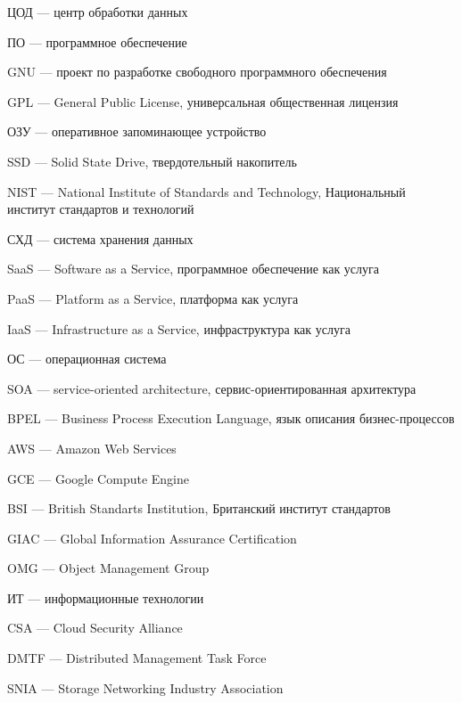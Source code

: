 
\hypertarget{dc}{ЦОД --- центр обработки данных}

\hypertarget{soft}{ПО --- программное обеспечение}

\hypertarget{gnu}{GNU --- проект по разработке свободного программного обеспечения}

\hypertarget{gpl}{GPL --- General Public License, универсальная общественная лицензия}

\hypertarget{ram}{ОЗУ --- оперативное запоминающее устройство}

\hypertarget{ssd}{SSD --- Solid State Drive, твердотельный накопитель}

\hypertarget{nist}{NIST --- National Institute of Standards and Technology, Национальный институт стандартов и технологий}

\hypertarget{storage}{СХД --- система хранения данных}

\hypertarget{saas}{SaaS --- Software as a Service, программное обеспечение как услуга}

\hypertarget{paas}{PaaS --- Platform as a Service, платформа как услуга}

\hypertarget{iaas}{IaaS --- Infrastructure as a Service, инфраструктура как услуга}

\hypertarget{os}{ОС --- операционная система}

\hypertarget{soa}{SOA --- service-oriented architecture, сервис-ориентированная архитектура}

\hypertarget{bpel}{BPEL --- Business Process Execution Language, язык описания бизнес-процессов}

\hypertarget{aws}{AWS --- Amazon Web Services}

\hypertarget{gce}{GCE --- Google Compute Engine}

\hypertarget{bsi}{BSI --- British Standarts Institution, Британский институт стандартов}

\hypertarget{giac}{GIAC --- Global Information Assurance Certification}

\hypertarget{omg}{OMG --- Object Management Group}

\hypertarget{it}{ИТ --- информационные технологии}

\hypertarget{csa}{CSA --- Cloud Security Alliance}

\hypertarget{dmtf}{DMTF --- Distributed Management Task Force}

\hypertarget{snia}{SNIA --- Storage Networking Industry Association}

